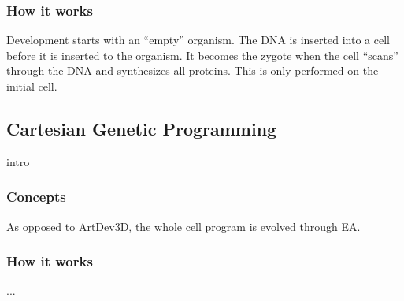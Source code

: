 \subsubsection{How it works}
Development starts with an ``empty'' organism. The DNA is inserted into a cell before it is inserted to the organism. It becomes the zygote when the cell ``scans'' through the DNA and synthesizes all proteins. This is only performed on the initial cell. 


\subsection{Cartesian Genetic Programming}
intro

\subsubsection{Concepts}
As opposed to ArtDev3D, the whole cell program is evolved through EA.

\subsubsection{How it works}
...
